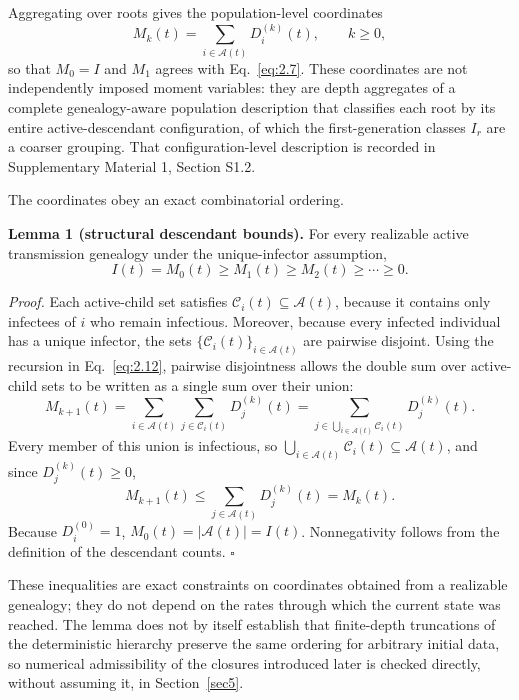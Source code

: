 \documentclass[review,12pt]{elsarticle}
\numberwithin{equation}{section}
\theoremstyle{remark}
\begin{document}
Aggregating over roots gives the population-level coordinates
\begin{equation}
M_k(t) = \sum_{i\in\mathcal A(t)} D_i^{(k)}(t), \qquad k\geq0,
\label{eq:2.15}
\end{equation}
so that $M_0=I$ and $M_1$ agrees with Eq.~\eqref{eq:2.7}. These coordinates are not independently imposed moment variables: they are depth aggregates of a complete genealogy-aware population description that classifies each root by its entire active-descendant configuration, of which the first-generation classes $I_r$ are a coarser grouping. That configuration-level description is recorded in Supplementary Material 1, Section S1.2.

The coordinates obey an exact combinatorial ordering.

\textbf{Lemma 1 (structural descendant bounds).} For every realizable active transmission genealogy under the unique-infector assumption,
\begin{equation}
I(t) = M_0(t) \geq M_1(t) \geq M_2(t) \geq \cdots \geq 0.
\label{eq:2.17}
\end{equation}

\textit{Proof.} Each active-child set satisfies $\mathcal C_i(t)\subseteq\mathcal A(t)$, because it contains only infectees of $i$ who remain infectious. Moreover, because every infected individual has a unique infector, the sets $\{\mathcal C_i(t)\}_{i\in\mathcal A(t)}$ are pairwise disjoint. Using the recursion in Eq.~\eqref{eq:2.12}, pairwise disjointness allows the double sum over active-child sets to be written as a single sum over their union:
\[
M_{k+1}(t) = \sum_{i\in\mathcal A(t)} \sum_{j\in\mathcal C_i(t)} D_j^{(k)}(t) = \sum_{j\in\bigcup_{i\in\mathcal A(t)}\mathcal C_i(t)} D_j^{(k)}(t).
\]
Every member of this union is infectious, so $\bigcup_{i\in\mathcal A(t)}\mathcal C_i(t) \subseteq \mathcal A(t)$, and since $D_j^{(k)}(t)\geq0$,
\begin{equation}
M_{k+1}(t) \leq \sum_{j\in\mathcal A(t)} D_j^{(k)}(t) = M_k(t).
\label{eq:2.19}
\end{equation}
Because $D_i^{(0)}=1$, $M_0(t)=|\mathcal A(t)|=I(t)$. Nonnegativity follows from the definition of the descendant counts. \hfill$\square$

These inequalities are exact constraints on coordinates obtained from a realizable genealogy; they do not depend on the rates through which the current state was reached. The lemma does not by itself establish that finite-depth truncations of the deterministic hierarchy preserve the same ordering for arbitrary initial data, so numerical admissibility of the closures introduced later is checked directly, without assuming it, in Section~\ref{sec5}.
\end{document}
